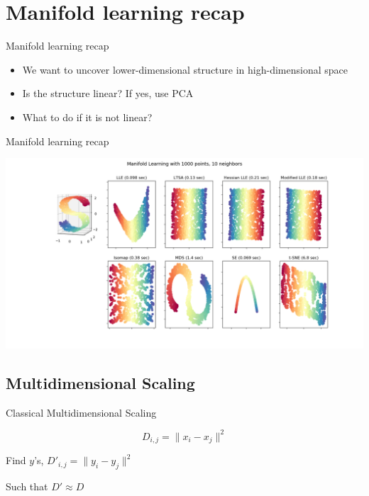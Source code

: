 \documentclass[unknownkeysallowed]{beamer}
\begin{document}
\section{Manifold learning recap}
\begin{frame}{Manifold learning recap}

\begin{itemize}
\item We want to uncover lower-dimensional structure in high-dimensional space
\item Is the structure linear? If yes, use PCA
\item What to do if it is not linear?
\end{itemize}
\end{frame}
\begin{frame}{Manifold learning recap}



\includegraphics[width=\textwidth,height=0.8\textheight,keepaspectratio]{manifold_algorithms}

\end{frame}

\subsection{Multidimensional Scaling}
\begin{frame}{Classical Multidimensional Scaling}


$$D_{i,j} = \|x_i - x_j\|^2$$

Find $y$'s, $D'_{i,j} = \|y_i - y_j\|^2$ 

Such that $D' \approx D$

\end{frame}
\end{document}
